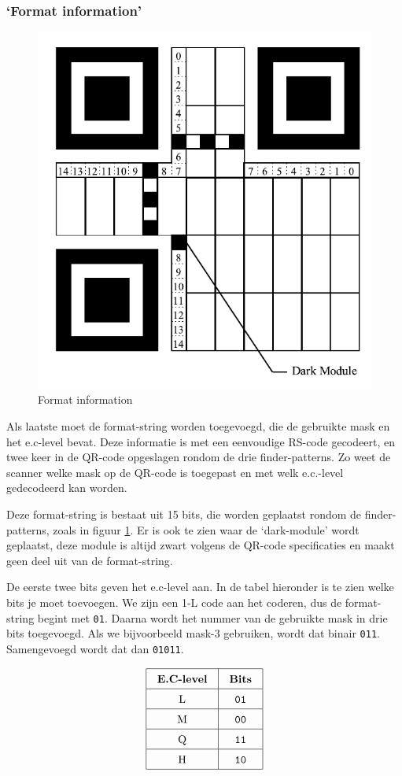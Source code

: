 \documentclass[a4paper]{article}
\begin{document}
\subsubsection{`Format information'}
\begin{figure}[htbp]
\centering
\includegraphics[width=0.4\linewidth]{format-string.pdf}
\caption[Format information]{Format information\footnotemark}
\label{fig:format-string}
\end{figure}
Als laatste moet de format-string worden toegevoegd, die de gebruikte mask en het e.c-level bevat. Deze informatie is met een eenvoudige RS-code gecodeert, en twee keer in de QR-code opgeslagen rondom de drie finder-patterns. Zo weet de scanner welke mask op de QR-code is toegepast en met welk e.c.-level gedecodeerd kan worden.

Deze format-string is bestaat uit 15 bits, die worden geplaatst rondom de finder-patterns, zoals in figuur \ref{fig:format-string}. Er is ook te zien waar de `dark-module' wordt geplaatst, deze module is altijd zwart volgens de QR-code specificaties en maakt geen deel uit van de format-string.

De eerste twee bits geven het e.c-level aan. In de tabel hieronder is te zien welke bits je moet toevoegen. We zijn een 1-L code aan het coderen, dus de format-string begint met \texttt{01}. Daarna wordt het nummer van de gebruikte mask in drie bits toegevoegd. Als we bijvoorbeeld mask-3 gebruiken, wordt dat binair \texttt{011}. Samengevoegd wordt dat dan \texttt{01011}.

\[
\setlength{\tabcolsep}{10pt}
\def\arraystretch{1.5}
\begin{tabular}{|c|c|}
\hline
\bfseries E.C-level & \bfseries Bits\\\hline
L & \texttt{01}\\\hline
M & \texttt{00}\\\hline
Q & \texttt{11}\\\hline
H & \texttt{10}\\\hline
\end{tabular}
\]
\end{document}
